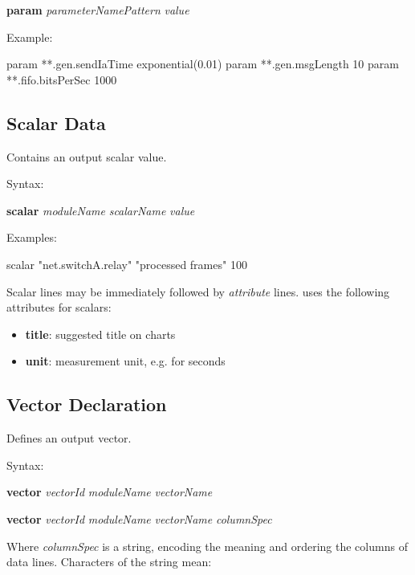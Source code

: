 \hspace{20mm} \textbf{param} \textit{parameterNamePattern} \textit{value}

Example:

\begin{filelisting}
param **.gen.sendIaTime  exponential(0.01)
param **.gen.msgLength   10
param **.fifo.bitsPerSec 1000
\end{filelisting}


\subsection{Scalar Data}
\label{sec:result-file-formats:opp:scalar-data}

Contains an output scalar value.

Syntax:

\hspace{20mm} \textbf{scalar} \textit{moduleName} \textit{scalarName} \textit{value}

Examples:

\begin{filelisting}
scalar "net.switchA.relay" "processed frames" 100
\end{filelisting}

Scalar lines may be immediately followed by \textit{attribute} lines.
{\opp} uses the following attributes for scalars:

\begin{itemize}
    \item \textbf{title}: suggested title on charts
    \item \textbf{unit}: measurement unit, e.g.  for seconds
\end{itemize}


\subsection{Vector Declaration}
\label{sec:result-file-formats:opp:vector-declaration}

Defines an output vector.

Syntax:

\hspace{20mm} \textbf{vector} \textit{vectorId} \textit{moduleName} \textit{vectorName}

\hspace{20mm} \textbf{vector} \textit{vectorId} \textit{moduleName} \textit{vectorName} \textit{columnSpec}

Where \textit{columnSpec} is a string, encoding the meaning and ordering
the columns of data lines. Characters of the string mean:

